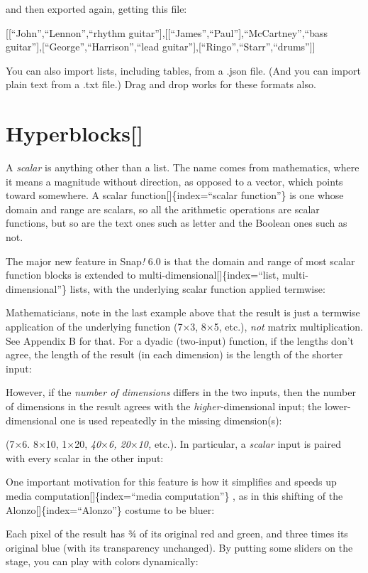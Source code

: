 \documentclass[
  letterpaper,
]{book}
\begin{document}
and then exported again, getting this file:

{[}{[}``John'',``Lennon'',``rhythm
guitar''{]},{[}{[}``James'',``Paul''{]},``McCartney'',``bass
guitar''{]},{[}``George'',``Harrison'',``lead
guitar''{]},{[}``Ringo'',``Starr'',``drums''{]}{]}

You can also import lists, including tables, from a .json file. (And you
can import plain text from a .txt file.) Drag and drop works for these
formats also.

\section{Hyperblocks{[}{]}}\label{hyperblocks}

A \emph{scalar} is anything other than a list. The name comes from
mathematics, where it means a magnitude without direction, as opposed to
a vector, which points toward somewhere. A scalar
function{[}{]}\{index=``scalar function''\} is one whose domain and
range are scalars, so all the arithmetic operations are scalar
functions, but so are the text ones such as letter and the Boolean ones
such as not.

The major new feature in Snap\emph{!} 6.0 is that the domain and range
of most scalar function blocks is extended to
multi-dimensional{[}{]}\{index=``list, multi-dimensional''\} lists, with
the underlying scalar function applied termwise:

Mathematicians, note in the last example above that the result is just a
termwise application of the underlying function (7×3, 8×5, etc.),
\emph{not} matrix multiplication. See Appendix B for that. For a dyadic
(two-input) function, if the lengths don't agree, the length of the
result (in each dimension) is the length of the shorter input:

However, if the \emph{number of dimensions} differs in the two inputs,
then the number of dimensions in the result agrees with the
\emph{higher-}dimensional input; the lower-dimensional one is used
repeatedly in the missing dimension(s):

(7×6. 8×10, 1×20, \emph{40}×\emph{6, 20}×\emph{10,} etc.). In
particular, a \emph{scalar} input is paired with every scalar in the
other input:

One important motivation for this feature is how it simplifies and
speeds up media computation{[}{]}\{index=``media computation''\} , as in
this shifting of the Alonzo{[}{]}\{index=``Alonzo''\} costume to be
bluer:

Each pixel of the result has ¾ of its original red and green, and three
times its original blue (with its transparency unchanged). By putting
some sliders on the stage, you can play with colors dynamically:
\end{document}
